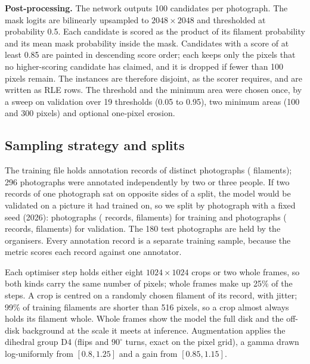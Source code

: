\documentclass[sigconf]{acmart}
\begin{document}
\textbf{Post-processing.} The network outputs 100 candidates per photograph. The mask
logits are bilinearly upsampled to $2048\times2048$ and thresholded at probability 0.5.
Each candidate is scored as the product of its filament probability and its mean mask
probability inside the mask. Candidates with a score of at least 0.85 are painted in
descending score order; each keeps only the pixels that no higher-scoring candidate has
claimed, and it is dropped if fewer than 100 pixels remain. The instances are therefore
disjoint, as the scorer requires, and are written as RLE rows. The threshold and the
minimum area were chosen once, by a sweep on validation over 19 thresholds (0.05 to
0.95), two minimum areas (100 and 300 pixels) and optional one-pixel erosion.

\subsection{Sampling strategy and splits}
The training file holds \AllRecords{} annotation records of \AllPhotos{} distinct
photographs (\AllFilaments{} filaments); 296 photographs were annotated independently
by two or three people. If two records of one photograph sat on opposite sides of a
split, the model would be validated on a picture it had trained on, so we split by
photograph with a fixed seed (2026): \TrainPhotos{} photographs (\TrainRecords{}
records, \TrainGT{} filaments) for training and \ValPhotos{} photographs
(\ValRecords{} records, \ValGT{} filaments) for validation. The 180 test photographs
are held by the organisers. Every annotation record is a separate training sample,
because the metric scores each record against one annotator.

Each optimiser step holds either eight $1024\times1024$ crops or two whole frames, so
both kinds carry the same number of pixels; whole frames make up 25\% of the steps.
A crop is centred on a randomly chosen filament of its record, with jitter; 99\% of
training filaments are shorter than 516 pixels, so a crop almost always holds its
filament whole. Whole frames show the model the full disk and the off-disk background
at the scale it meets at inference. Augmentation applies the dihedral group D4 (flips
and $90^{\circ}$ turns, exact on the pixel grid), a gamma drawn log-uniformly from
$[0.8,1.25]$ and a gain from $[0.85,1.15]$.
\end{document}

